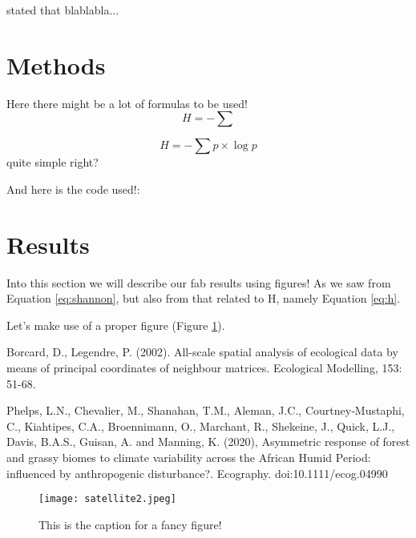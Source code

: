 \documentclass[a4paper,12pt]{article}
\begin{document}
\citet{phelps} stated that blablabla...

\section{Methods}
Here there might be a lot of formulas to be used!
\begin{equation}
    H = - \sum
\label{eq:h}
\end{equation}

\begin{equation}
    H = - \sum p \times \log{p}
\label{eq:shannon}
\end{equation}
quite simple right?

And here is the code used!:


\section{Results}
Into this section we will describe our fab results using figures! As we saw from Equation \ref{eq:shannon}, but also from that related to H, namely Equation  \ref{eq:h}.

Let's make use of a proper figure (Figure \ref{fig:sat}).

\begin{thebibliography}{999}
Borcard, D., Legendre, P. (2002). All-scale spatial analysis of ecological data by means of principal coordinates of neighbour matrices. Ecological Modelling, 153: 51-68.

Phelps, L.N., Chevalier, M., Shanahan, T.M., Aleman, J.C., Courtney‐Mustaphi, C., Kiahtipes, C.A., Broennimann, O., Marchant, R., Shekeine, J., Quick, L.J., Davis, B.A.S., Guisan, A. and Manning, K. (2020), Asymmetric response of forest and grassy biomes to climate variability across the African Humid Period: influenced by anthropogenic disturbance?. Ecography. doi:10.1111/ecog.04990


\end{thebibliography}

\newpage

\begin{figure}
    \centering
    \texttt{[image: satellite2.jpeg]}
    \caption{This is the caption for a fancy figure!}
    \label{fig:sat}
\end{figure}
\end{document}
